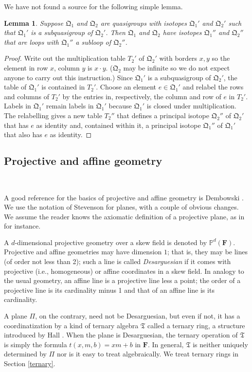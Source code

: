 \documentclass[reqno,12pt]{amsart}
\newtheorem{lem}[thm]{Lemma}
\theoremstyle{remark}
\numberwithin{equation}{section}
\numberwithin{figure}{section}
\newcommand \bbP{\mathbb{P}}
\newcommand\fF{\mathbf{F}}	%
\newcommand \fQ{\mathfrak Q}
\newcommand \fT{\mathfrak T}
\newcommand\PP{\Pi}	%
\begin{document}
We have not found a source for the following simple lemma.  

\begin{lem}\label{L:subisotope}
Suppose $\fQ_1$ and $\fQ_2$ are quasigroups with isotopes $\fQ_1'$ and $\fQ_2'$ such that $\fQ_1'$ is a subquasigroup of $\fQ_2'$.  Then $\fQ_1$ and $\fQ_2$ have isotopes $\fQ_1''$ and $\fQ_2''$ that are loops with $\fQ_1''$ a subloop of $\fQ_2''$.
\end{lem}

\begin{proof}
Write out the multiplication table $T_2'$ of $\fQ_2'$ with borders $x, y$ so the element in row $x$, column $y$ is $x \cdot y$.  ($\fQ_2$ may be infinite so we do not expect anyone to carry out this instruction.)  Since $\fQ_1'$ is a subquasigroup of $\fQ_2'$, the table of $\fQ_1'$ is contained in $T_2'$.  
Choose an element $e \in \fQ_1'$ and relabel the rows and columns of $T_2'$ by the entries in, respectively, the column and row of $e$ in $T_2'$.  Labels in $\fQ_1'$ remain labels in $\fQ_1'$ because $\fQ_1'$ is closed under multiplication.  The relabelling gives a new table $T_2''$ that defines a principal isotope $\fQ_2''$ of $\fQ_2'$ that has $e$ as identity and, contained within it, a principal isotope $\fQ_1''$ of $\fQ_1'$ that also has $e$ as identity.
\end{proof}


\subsection{Projective and affine geometry}\label{geom}\

A good reference for the basics of projective and affine geometry is Dembowski \cite{Demb}.
We use the notation of Stevenson \cite{st} for planes, with a couple of obvious changes.
We assume the reader knows the axiomatic definition of a projective plane, as in \cite{Demb, HP, st} for instance.  

A $d$-dimensional projective geometry over a skew field is denoted by $\bbP^d(\fF)$.  Projective and affine geometries may have dimension $1$; that is, they may be lines (of order not less than 2); such a line is called \emph{Desarguesian} if it comes with projective (i.e., homogeneous) or affine coordinates in a skew field.  In analogy to the usual geometry, an affine line is a projective line less a point; the order of a projective line is its cardinality minus 1 and that of an affine line is its cardinality.

A plane $\PP$, on the contrary, need not be Desarguesian, but even if not, it has a coordinatization by a kind of ternary algebra $\fT$ called a ternary ring, a structure introduced by Hall \cite{PTR}.  
When the plane is Desarguesian, the ternary operation of $\fT$ is simply the formula $t(x,m,b) = xm+b$ in $\fF$.  In general, $\fT$ is neither uniquely determined by $\PP$ nor is it easy to treat algebraically.  
We treat ternary rings in Section \ref{ternary}.
\end{document}
